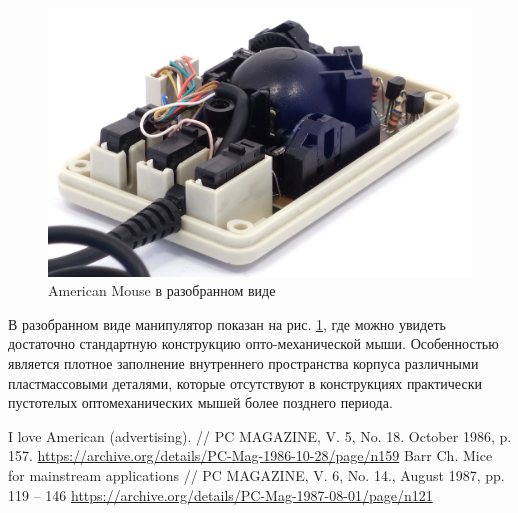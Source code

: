 \documentclass[11pt, a4paper]{article}
\begin{document}
\begin{figure}[h]
    \centering
    \includegraphics[scale=0.9]{1986_american_mouse/inside_60.jpg}
    \caption{American Mouse в разобранном виде}
    \label{fig:AmericanInside}
\end{figure}

В разобранном виде манипулятор показан на рис. \ref{fig:AmericanInside}, где можно увидеть достаточно стандартную конструкцию опто-механической мыши. Особенностью является плотное заполнение внутреннего пространства корпуса различными пластмассовыми деталями, которые отсутствуют в конструкциях практически пустотелых оптомеханических мышей более позднего периода.

\begin{thebibliography}{9}
 I love American (advertising). // PC MAGAZINE, V. 5, No. 18. October 1986, p. 157. \url{https://archive.org/details/PC-Mag-1986-10-28/page/n159}
 Barr Ch. Mice for mainstream applications // PC MAGAZINE, V. 6, No. 14., August 1987, pp. 119 – 146 \url{https://archive.org/details/PC-Mag-1987-08-01/page/n121}
\end{thebibliography}
\end{document}
